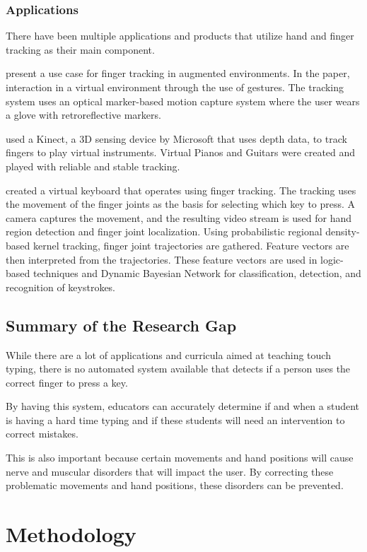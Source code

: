 \documentclass{report}
\begin{document}
\subsection{Applications}

There have been multiple applications and products that utilize hand and finger
tracking as their main component.

\cite{dorf2001} present a use case for finger tracking in augmented
environments. In the paper, interaction in a virtual environment through the use
of gestures. The tracking system uses an optical marker-based motion capture
system where the user wears a glove with retroreflective markers.

\cite{chiang2014} used a Kinect, a 3D sensing device by Microsoft that
uses depth data, to track fingers to play virtual instruments. Virtual Pianos
and Guitars were created and played with reliable and stable tracking.

\cite{yousaf2014} created a virtual keyboard that operates using finger
tracking. The tracking uses the movement of the finger joints as the basis for
selecting which key to press. A camera captures the movement, and the resulting
video stream is used for hand region detection and finger joint localization.
Using probabilistic regional density-based kernel tracking, finger joint
trajectories are gathered. Feature vectors are then interpreted from the
trajectories. These feature vectors are used in logic-based techniques and
Dynamic Bayesian Network for classification, detection, and recognition of
keystrokes.

\section{Summary of the Research Gap}
While there are a lot of applications and curricula aimed at teaching touch
typing, there is no automated system available that detects if a person uses the
correct finger to press a key.

By having this system, educators can accurately determine if and when a student
is having a hard time typing and if these students will need an intervention to
correct mistakes.

This is also important because certain movements and hand positions will cause
nerve and muscular disorders that will impact the user. By correcting these
problematic movements and hand positions, these disorders can be prevented.

\chapter{Methodology}
\end{document}
